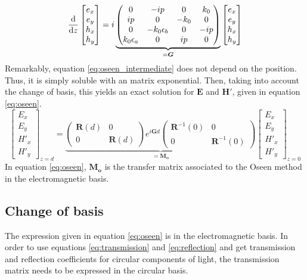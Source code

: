 \begin{eqnarray}
\dv{z}\begin{bmatrix}
e_x\\e_y\\h_x\\h_y
\end{bmatrix} = i\underbrace{\begin{pmatrix}
	0 & -ip & 0 & k_0\\
	ip & 0 & -k_0 & 0\\
	0 & -k_0\epsilon_b & 0 & -ip\\
	k_0\epsilon_a & 0 & ip & 0\\
	\end{pmatrix}}_{=\bm{G}}\begin{bmatrix}
e_x\\e_y\\h_x\\h_y
\end{bmatrix} \label{eq:oseen_intermediate}
\end{eqnarray}
%
Remarkably, equation \ref{eq:oseen_intermediate} does not depend on the position. Thus, it is simply soluble with an matrix exponential. Then, taking into account the change of basis, this yields an exact solution for $\bm{E}$ and $\bm{H'}$, given in equation \ref{eq:oseen}. 
\begin{equation}
\begin{bmatrix}
E_x\\E_y\\H'_x\\H'_y
\end{bmatrix}_{z=d} = \underbrace{\begin{pmatrix}
	\bm{R}(d) & 0\\0 & \bm{R}(d)
	\end{pmatrix}e^{i\bm{G}d}\begin{pmatrix}
		\bm{R}^{-1}(0) & 0\\0 & \bm{R}^{-1}(0)
		\end{pmatrix}}_{=\bm{M_o}}\begin{bmatrix}
E_x\\E_y\\H'_x\\H'_y
\end{bmatrix}_{z=0} \label{eq:oseen}
\end{equation}
%
In equation \ref{eq:oseen}, $\bm{M_o}$ is the transfer matrix associated to the Oseen method in the electromagnetic basis.

\subsection{Change of basis}
\label{sec:chg_basis_oseen}
The expression given in equation \ref{eq:oseen} is in the electromagnetic basis. In order to use equations \ref{eq:transmission} and \ref{eq:reflection} and get transmission and reflection coefficients for circular components of light, the transmission matrix needs to be expressed in the circular basis.

